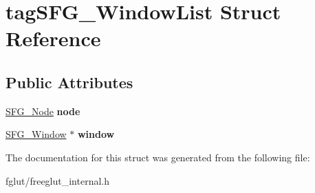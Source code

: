 \hypertarget{structtag_s_f_g___window_list}{}\section{tag\+S\+F\+G\+\_\+\+Window\+List Struct Reference}
\label{structtag_s_f_g___window_list}
\subsection*{Public Attributes}
\begin{DoxyCompactItemize}
\item 
\hyperlink{structtag_s_f_g___node}{S\+F\+G\+\_\+\+Node} {\bfseries node}\hypertarget{structtag_s_f_g___window_list_a39fbea46c53b50c972d3e6dd8423001c}{}\label{structtag_s_f_g___window_list_a39fbea46c53b50c972d3e6dd8423001c}

\item 
\hyperlink{structtag_s_f_g___window}{S\+F\+G\+\_\+\+Window} $\ast$ {\bfseries window}\hypertarget{structtag_s_f_g___window_list_a29be4f8f539653d5c91d2fed411ed950}{}\label{structtag_s_f_g___window_list_a29be4f8f539653d5c91d2fed411ed950}

\end{DoxyCompactItemize}


The documentation for this struct was generated from the following file\+:\begin{DoxyCompactItemize}
\item 
fglut/freeglut\+\_\+internal.\+h\end{DoxyCompactItemize}

